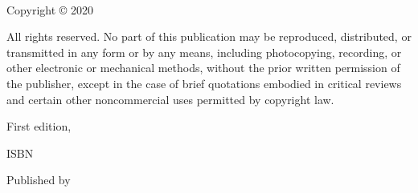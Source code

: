 
{\small
\setlength{\parindent}{0em}\setlength{\parskip}{1em}

~

\vfill

Copyright \copyright{} 2020 \authorname

All rights reserved. No part of this publication may be reproduced, distributed, or transmitted in any form or by any means, including photocopying, recording, or other electronic or mechanical methods, without the prior written permission of the publisher, except in the case of brief quotations embodied in critical reviews and certain other noncommercial uses permitted by copyright law.

First edition, \editionyear{}

ISBN \isbn{}  %

Published by \publisher{}
}
